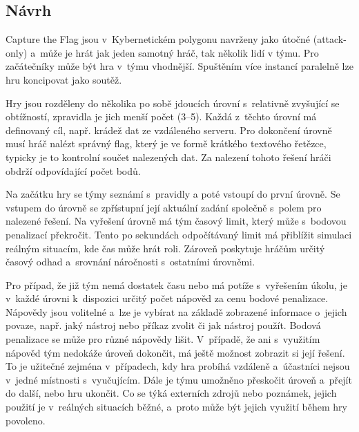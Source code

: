 \documentclass[
  digital, %
  oneside, %
  table,   %
  nolof,     %
  nolot,     %
  nocover
]{fithesis3}
\begin{document}
\subsection{Návrh} \label{gameDesign}
Capture the Flag jsou v~Kybernetickém polygonu navrženy jako útočné (attack-only) a~může je hrát jak jeden samotný hráč, tak několik lidí v týmu. Pro začátečníky může být hra v~týmu vhodnější. Spuštěním více instancí paralelně lze hru koncipovat jako soutěž.\par
Hry jsou rozděleny do několika po sobě jdoucích úrovní s~relativně zvyšující se obtížností, zpravidla je jich menší počet (3–5). Každá z~těchto úrovní má definovaný cíl, např. krádež dat ze vzdáleného serveru. Pro dokončení úrovně musí hráč nalézt správný flag, který je ve formě krátkého textového řetězce, typicky je to kontrolní součet nalezených dat. Za nalezení tohoto řešení hráči obdrží odpovídající počet bodů.\par
Na začátku hry se týmy seznámí s~pravidly a poté vstoupí do první úrovně. Se vstupem do úrovně se zpřístupní její aktuální zadání společně s~polem pro nalezené řešení. Na vyřešení úrovně má tým časový limit, který může s~bodovou penalizací překročit. Tento po sekundách odpočítávaný limit má přiblížit simulaci reálným situacím, kde čas může hrát roli. Zároveň poskytuje hráčům určitý časový odhad a~srovnání náročnosti s~ostatními úrovněmi.\par
Pro případ, že již tým nemá dostatek času nebo má potíže s~vyřešením úkolu, je v~každé úrovni k~dispozici určitý počet nápověd za cenu bodové penalizace. Nápovědy jsou volitelné a~lze je vybírat na základě zobrazené informace o~jejich povaze, např. jaký nástroj nebo příkaz zvolit či jak nástroj použít. Bodová penalizace se může pro různé nápovědy lišit. V~případě, že ani s~využitím nápověd tým nedokáže úroveň dokončit, má ještě možnost zobrazit si její řešení. To je užitečné zejména v~případech, kdy hra probíhá vzdáleně a~účastníci nejsou v~jedné místnosti s~vyučujícím. Dále je týmu umožněno přeskočit úroveň a~přejít do další, nebo hru ukončit. Co se týká externích zdrojů nebo poznámek, jejich použití je v~reálných situacích běžné, a~proto může být jejich využití během hry povoleno. \cite{ctfDesign}\par
\end{document}
